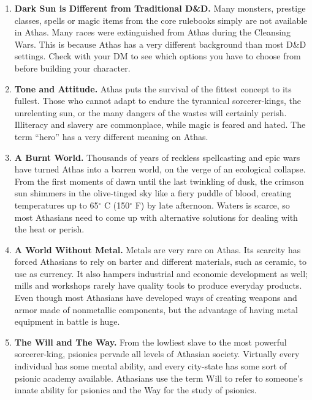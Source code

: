 \begin{enumerate}
\item \textbf{{\tableheader Dark Sun} is Different from Traditional D\&D.} Many monsters, prestige classes, spells or magic items from the core rulebooks simply are not available in Athas. Many races were extinguished from Athas during the Cleansing Wars. This is because Athas has a very different background than most D\&D settings. Check with your DM to see which options you have to choose from before building your character.

\item \textbf{Tone and Attitude.} Athas puts the survival of the fittest concept to its fullest. Those who cannot adapt to endure the tyrannical sorcerer-kings, the unrelenting sun, or the many dangers of the wastes will certainly perish. Illiteracy and slavery are commonplace, while magic is feared and hated. The term ``hero'' has a very different meaning on Athas.

\item \textbf{A Burnt World.} Thousands of years of reckless spellcasting and epic wars have turned Athas into a barren world, on the verge of an ecological collapse. From the first moments of dawn until the last twinkling of dusk, the crimson sun shimmers in the olive-tinged sky like a fiery puddle of blood, creating temperatures up to 65$^\circ$ C (150$^\circ$ F) by late afternoon. Waters is scarce, so most Athasians need to come up with alternative solutions for dealing with the heat or perish.

\item \textbf{A World Without Metal.} Metals are very rare on Athas. Its scarcity has forced Athasians to rely on barter and different materials, such as ceramic, to use as currency. It also hampers industrial and economic development as well; mills and workshops rarely have quality tools to produce everyday products. Even though most Athasians have developed ways of creating weapons and armor made of nonmetallic components, but the advantage of having metal equipment in battle is huge.

\item \textbf{The Will and The Way.} From the lowliest slave to the most powerful sorcerer-king, psionics pervade all levels of Athasian society. Virtually every individual has some mental ability, and every city-state has some sort of psionic academy available. Athasians use the term Will to refer to someone's innate ability for psionics and the Way for the study of psionics.


\end{enumerate}
